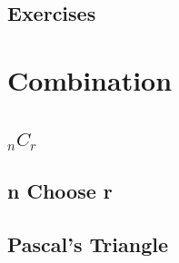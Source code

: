 \subsection{Exercises}

\newpage
\section{Combination}
\noindent{}
\subsection{$_nC_r$}
\subsection{n Choose r}
\subsection{Pascal's Triangle}

